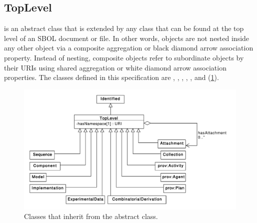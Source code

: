 


\subsection {TopLevel}
\label{sec:TopLevel}
 is an abstract class that is extended by any  class that can be found at the top level of an SBOL document or file. In other words,  objects are not nested inside any other object via a composite aggregation or black diamond arrow association property. Instead of nesting, composite  objects refer to subordinate  objects by their URIs using shared aggregation or white diamond arrow association properties. The  classes defined in this specification are , , , ,  , and  (\ref{uml:toplevel}).

\begin{figure}[ht]
\begin{center}
\includegraphics[width=\textwidth]{uml/toplevel}
\caption[]{Classes that inherit from the  abstract class.}
\label{uml:toplevel}
\end{center}
\end{figure}

